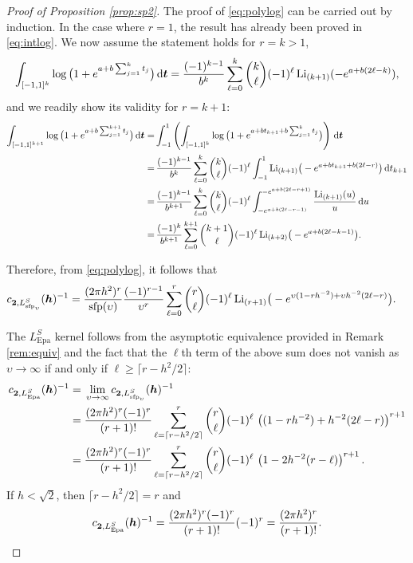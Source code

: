 \documentclass[oneside,11pt]{article}
\begin{document}
\begin{proof}[Proof of Proposition \ref{prop:sp2}]
The proof of \eqref{eq:polylog} can be carried out by induction. In the case where $r=1$, the result has already been proved in \eqref{eq:intlog}. We now assume the statement holds for $r=k> 1$,
\begin{align*}
	\int_{[-1,1]^{k}} \log \big(1+e^{a+b \sum_{j=1}^{k}t_j}\big) \,\mathrm{d} \boldsymbol{t}
	=\frac{(-1)^{k-1}}{b^{k}}\sum_{\ell=0}^{k}\binom{k}{\ell} (-1)^\ell\, \mathrm{Li}_{(k+1)}(-e^{a+b(2\ell-k)}),
\end{align*}
and we readily show its validity for $r=k+1$:
\begin{align*}
	\int_{[-1,1]^{k+1}} \log \big(1+e^{a+b \sum_{j=1}^{k+1}t_j}\big) \,\mathrm{d} \boldsymbol{t}
	=&\int_{-1}^1\left(\int_{[-1,1]^{k}} \log \big(1+e^{a+bt_{k+1}+b \sum_{j=1}^{k}t_j}\big)\right) \,\mathrm{d} \boldsymbol{t}\\
    =&\,\frac{(-1)^{k-1}}{b^{k}}\sum_{\ell=0}^{k}\binom{k}{\ell} (-1)^\ell\int_{-1}^1 \mathrm{Li}_{(k+1)}\big(-e^{a+bt_{k+1}+b(2\ell-r)}\big) \,\mathrm{d} t_{k+1}\\
    =&\, \frac{(-1)^{k-1}}{b^{k+1}}\sum_{\ell=0}^{k}\binom{k}{\ell} (-1)^\ell\int_{-e^{a+b(2\ell-r-1)}}^{-e^{a+b(2\ell-r+1)}}\frac{\mathrm{Li}_{(k+1)}(u)}{u} \,\mathrm{d} u\\
    =&\,\frac{(-1)^{k}}{b^{k+1}}\sum_{\ell=0}^{k+1}\binom{k+1}{\ell} (-1)^\ell\, \mathrm{Li}_{(k+2)}\big(-e^{a+b(2\ell-k-1)}\big).
\end{align*}

Therefore, from \eqref{eq:polylog}, it follows that
\begin{align*}
    c_{\mathbf{2},L_{\mathrm{sfp}_\upsilon}^{S}}({\boldsymbol{h}})^{-1}
    =&\;\frac{(2\pi h^2)^r}{\mathrm{sfp}(\upsilon)}\frac{(-1)^{r-1}}{\upsilon^r}\sum_{\ell=0}^{r}\binom{r}{\ell} (-1)^\ell\, \mathrm{Li}_{(r+1)}\big(-e^{\upsilon(1-rh^{-2})+\upsilon h^{-2}(2\ell-r)}\big).
\end{align*}

The $L_\mathrm{Epa}^{S}$ kernel follows from the asymptotic equivalence provided in Remark \ref{rem:equiv} and the fact that the $\ell$th term of the above sum does not vanish as $\upsilon\to\infty$ if and only if $\ell\geq \lceil r-h^2/2 \rceil$:
\begin{align*}
   c_{\two,L_\mathrm{Epa}^{S}}(\bh)^{-1}=&\;\lim_{\upsilon\to\infty}c_{\two,L_{\mathrm{sfp}_\upsilon}^{S}}(\bh)^{-1}\\
%
    =&\;\frac{(2\pi h^2)^r(-1)^{r}}{(r+1)!}\sum_{\ell=\lceil r-h^2/2 \rceil}^{r}\binom{r}{\ell} (-1)^\ell\, \lrp{(1-rh^{-2})+h^{-2}(2\ell-r)}^{r+1}\\
    =&\;\frac{(2\pi h^2)^r(-1)^{r}}{(r+1)!}\sum_{\ell=\lceil r-h^2/2 \rceil}^{r}\binom{r}{\ell} (-1)^\ell\, \lrp{1-2h^{-2}(r-\ell)}^{r+1}.
\end{align*}
If $h<\sqrt{2}$, then $\lceil r-h^2/2 \rceil=r$ and
\begin{align*}
   c_{\mathbf{2},L_\mathrm{Epa}^{S}}({\boldsymbol{h}})^{-1}=\frac{(2\pi h^2)^r(-1)^{r}}{(r+1)!} (-1)^r=\frac{(2\pi h^2)^r}{(r+1)!}.
\end{align*}
\end{proof}
\end{document}

